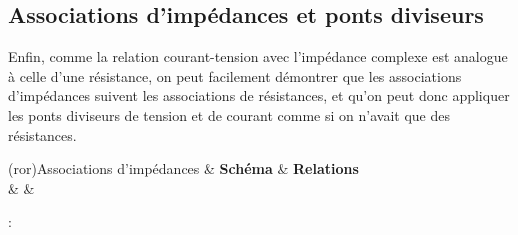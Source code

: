 \documentclass[../../main/main.tex]{subfiles}
\begin{document}
\subsection{Associations d'impédances et ponts diviseurs}
Enfin, comme la relation courant-tension avec l'impédance complexe est analogue
à celle d'une résistance, on peut facilement démontrer que les associations
d'impédances suivent les associations de résistances, et qu'on peut donc
appliquer les ponts diviseurs de tension et de courant comme si on n'avait que
des résistances.
\begin{tcb}[tabularx={l|Y|Y}](ror){Associations d'impédances}
	& \textbf{Schéma} & \textbf{Relations}
	\\\hline
	 &
	\vspace{-15pt}
	&
	\begin{itemize}
		 :
		\psw{
			\[\xul{Z}\ind{eq} = \xul{Z}_1 + \xul{Z}_2\]
		}
		\vspace{-15pt}

\end{itemize}
\end{tcb}
\end{document}
